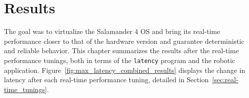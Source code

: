\documentclass[MMR,Master,english]{twbook}
\begin{document}

\chapter{Results}\label{cha:results}
The goal was to virtualize the Salamander 4 OS and bring its real-time performance closer to that of the hardware version and guarantee deterministic and reliable behavior. This chapter summarizes the results after the real-time performance tunings, both in terms of the \texttt{latency} program and the robotic application. Figure~\ref{fig:max_latency_combined_results} displays the change in latency after each real-time performance tuning, detailed in Section~\ref{sec:real-time_tunings}. 
\end{document}
